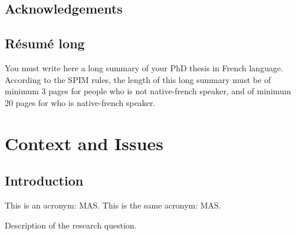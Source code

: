 \documentclass[english]{spimubephdthesis}
\begin{document}
\frontmatter

\chapter*{Acknowledgements}

\tableofcontents

\chapter*{R\'esum\'e long}

\begin{upmcaution}
	You must write here a long summary of your PhD thesis in French language.
	According to the SPIM rules, the length of this long summary must be of minimum 3 pages for people who is not native-french speaker, and of minimum 20 pages for who is native-french speaker.
\end{upmcaution}


\printacronyms

\mainmatter

\part{Context and Issues}

\chapter{Introduction}

This is an acronym: \ac{MAS}.
This is the same acronym: \ac{MAS}.

\begin{researchquestion}[a name]
   Description of the research question.
\end{researchquestion}
\end{document}
